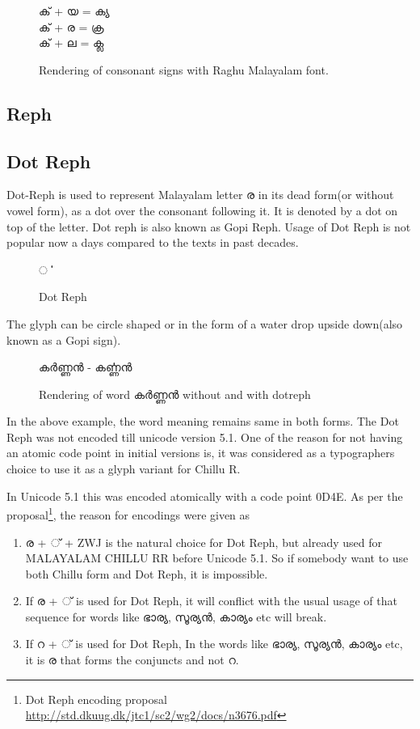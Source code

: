 \begin{figure}[h!]
  \centering
  {\raghumalayalam\textexample ക് + യ = ക്യ \\ ക് + ര = ക്ര \\ ക് + ല = ക്ല }\\
  \caption{Rendering of consonant signs with Raghu Malayalam font.}
\end{figure}

\subsection {Reph}
\subsection {Dot Reph}

Dot-Reph is used to represent Malayalam letter  {\meera ര} in its dead
form(or without vowel form), as a dot over the consonant
following it.  It is denoted by a dot on top of the letter.
Dot reph is also known as Gopi Reph.
Usage of Dot Reph is not popular now a days compared to the texts in past decades.

\begin{figure}[h!]
  \centering
  {\meera\textexample ൎ }\\
  \caption{Dot Reph}
\end{figure}

The glyph can be circle shaped or in the form of a water drop upside down(also known as a Gopi sign).

\begin{figure}[h!]
  \centering
  {\meera\textexample കര്‍ണ്ണന്‍  - കൎണ്ണന്‍ }\\
  \caption{Rendering of word കര്‍ണ്ണന്‍ without and with dotreph}
\end{figure}

In the above example, the word meaning remains same in both forms.
The Dot Reph was not encoded till unicode version 5.1.
One of the reason for not having an atomic code point in initial versions is,
it was considered as a typographers choice to use it as a glyph variant for Chillu R.

In Unicode 5.1 this was encoded atomically with a code point 0D4E.
As per the proposal\footnote{ Dot Reph encoding proposal \url{http://std.dkuug.dk/jtc1/sc2/wg2/docs/n3676.pdf}},
the reason for encodings were given as

\begin{enumerate}
\item  {\malayalam ര + ് + ZWJ} is the natural choice for Dot Reph, but already used
for MALAYALAM CHILLU RR before Unicode 5.1. So if somebody want to use both Chillu form and Dot Reph, it is impossible.
\item If {\malayalam ര + ് } is used for Dot Reph, it will conflict with the usual
usage of that sequence for words like {\malayalam ഭാര്യ, സൂര്യന്‍, കാര്യം } etc will break.
\item If {\malayalam റ + ് } is used for Dot Reph, In the words like
{\malayalam ഭാര്യ, സൂര്യന്‍, കാര്യം } etc, it is ര  that forms the conjuncts and not  {\malayalam റ}.
\end{enumerate}

